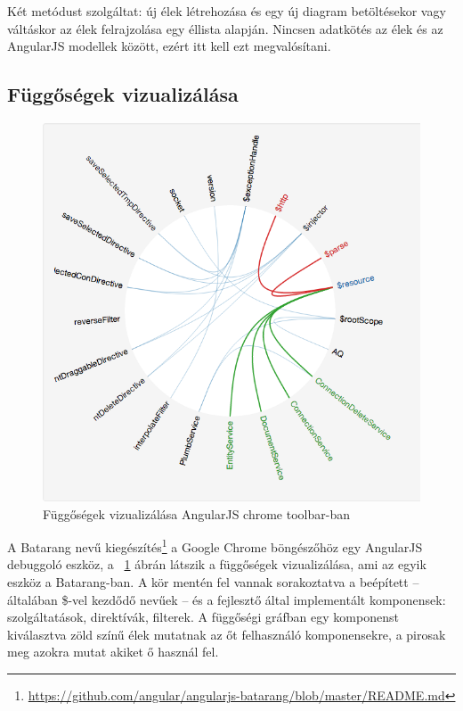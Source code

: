 Két metódust szolgáltat: új élek létrehozása és egy új diagram betöltésekor  vagy váltáskor az élek felrajzolása egy éllista alapján.
Nincsen adatkötés az élek és az AngularJS modellek között, ezért itt kell ezt megvalósítani.

\subsection{Függőségek vizualizálása}

\begin{figure}[!ht]
\centering
\includegraphics[width=15cm,keepaspectratio]{figures/dependencies.png}
\caption{Függőségek vizualizálása AngularJS chrome toolbar-ban}
\label{fig:angulardependencies}
\end{figure}



A Batarang nevű kiegészítés\footnote{\url{https://github.com/angular/angularjs-batarang/blob/master/README.md}} a Google Chrome böngészőhöz egy AngularJS debuggoló eszköz, a ~\ref{fig:angulardependencies} ábrán látszik a függőségek vizualizálása, ami az egyik eszköz a Batarang-ban. A kör mentén fel vannak sorakoztatva a beépített -- általában \$-vel kezdődő nevűek -- és a fejlesztő által implementált komponensek: szolgáltatások, direktívák, filterek. A függőségi gráfban egy komponenst kiválasztva zöld színű élek mutatnak az őt felhasználó komponensekre, a pirosak meg azokra mutat akiket ő használ fel.




